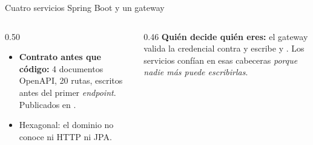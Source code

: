 \begin{frame}{Cuatro servicios Spring Boot y un gateway}
  \vspace{2pt}
  \begin{columns}[T]
    \begin{column}{0.50\textwidth}
      \begin{itemize}\scriptsize
        \item \textbf{Contrato antes que código:} 4 documentos OpenAPI, 20
              rutas, escritos antes del primer \emph{endpoint}. Publicados en
              .
        \item Hexagonal: el dominio no conoce ni HTTP ni JPA.
      \end{itemize}
    \end{column}
    \begin{column}{0.46\textwidth}
      {\scriptsize \textbf{Quién decide quién eres:} el gateway valida la
      credencial contra  y escribe  y
      . Los servicios confían en esas cabeceras
      \emph{porque nadie más puede escribirlas}.}
    \end{column}
  \end{columns}
\end{frame}
